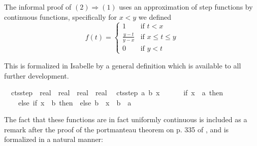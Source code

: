 \documentclass{article}
\theoremstyle{definition}
\begin{document}
\medskip

The informal proof of $(2) \Longrightarrow (1)$ uses an approximation of step functions by continuous functions, specifically for $x < y$ we defined
\[ f(t) = \begin{cases} 1 & \text{if $t < x$} \\
                        \frac{y - t}{y - x} & \text{if $x \le t \le y$} \\
                        0 & \text{if $y < t$} \end{cases} \]

This is formalized in Isabelle by a general definition which is available to all further development.

\medskip

\begin{isabellebody}
\isamarkupfalse%
\isanewline
\ \ cts{\isacharunderscore}step\ {\isacharcolon}{\isacharcolon}\ {\isachardoublequoteopen}real\ {\isasymRightarrow}\ real\ {\isasymRightarrow}\ real\ {\isasymRightarrow}\ real{\isachardoublequoteclose}\isanewline
{}\isanewline
\ \ {\isachardoublequoteopen}cts{\isacharunderscore}step\ a\ b\ x\ {\isasymequiv}\ \isanewline
\ \ \ \ if\ x\ {\isasymle}\ a\ then\ {}\isanewline
\ \ \ \ else\ {\isacharparenleft}if\ x\ {\isasymge}\ b\ then\ {}\ else\ {\isacharparenleft}b\ {\isacharminus}\ x{\isacharparenright}\ {\isacharslash}\ {\isacharparenleft}b\ {\isacharminus}\ a{\isacharparenright}{\isacharparenright}{\isachardoublequoteclose}
\end{isabellebody}

\medskip

The fact that these functions are in fact uniformly continuous is included as a remark after the proof of the portmanteau theorem on p. 335 of \cite{billingsley}, and is formalized in a natural manner:

\medskip
\end{document}
